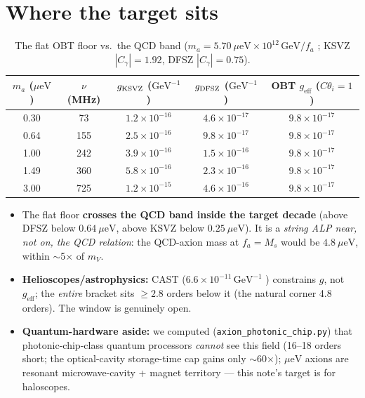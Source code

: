 \documentclass[11pt]{article}
\newcommand{\geff}{g_{\mathrm{eff}}}
\newcommand{\ueV}{\mu\mathrm{eV}}
\newcommand{\GeV}{\mathrm{GeV}}
\begin{document}
\section{Where the target sits}
\begin{table}[ht]
\centering
\begin{tabular}{ccccc}
\toprule
$m_a$ ($\ueV$) & $\nu$ (MHz) & $g_{\rm KSVZ}$ ($\GeV^{-1}$) & $g_{\rm DFSZ}$ ($\GeV^{-1}$) &
OBT $\geff$ ($C\theta_i{=}1$) \\
\midrule
0.30 & 73  & $1.2\times10^{-16}$ & $4.6\times10^{-17}$ & $9.8\times10^{-17}$ \\
0.64 & 155 & $2.5\times10^{-16}$ & $9.8\times10^{-17}$ & $9.8\times10^{-17}$ \\
1.00 & 242 & $3.9\times10^{-16}$ & $1.5\times10^{-16}$ & $9.8\times10^{-17}$ \\
1.49 & 360 & $5.8\times10^{-16}$ & $2.3\times10^{-16}$ & $9.8\times10^{-17}$ \\
3.00 & 725 & $1.2\times10^{-15}$ & $4.6\times10^{-16}$ & $9.8\times10^{-17}$ \\
\bottomrule
\end{tabular}
\caption{The flat OBT floor vs.\ the QCD band ($m_a = 5.70~\ueV \times 10^{12}\,\GeV/f_a$
\cite{GV2019}; KSVZ $|C_\gamma|=1.92$, DFSZ $|C_\gamma|=0.75$).}
\label{tab:band}
\end{table}

\begin{itemize}
\item The flat floor \textbf{crosses the QCD band inside the target decade} (above DFSZ below
$0.64~\ueV$, above KSVZ below $0.25~\ueV$). It is a \emph{string ALP near, not on, the QCD relation}:
the QCD-axion mass at $f_a = M_s$ would be $4.8~\ueV$, within $\sim$5$\times$ of $m_V$.
\item \textbf{Helioscopes/astrophysics:} CAST ($6.6\times10^{-11}\,\GeV^{-1}$ \cite{CAST2017})
constrains $g$, not $\geff$; the \emph{entire} bracket sits $\geq 2.8$ orders below it (the natural
corner 4.8 orders). The window is genuinely open.
\item \textbf{Quantum-hardware aside:} we computed (\texttt{axion\_photonic\_chip.py}) that
photonic-chip-class quantum processors \emph{cannot} see this field (16--18 orders short; the
optical-cavity storage-time cap gains only $\sim$60$\times$); $\ueV$ axions are resonant
microwave-cavity + magnet territory --- this note's target is for haloscopes.
\end{itemize}
\end{document}
